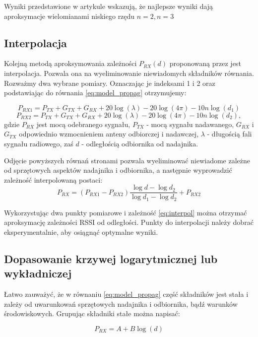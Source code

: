 Wyniki przedstawione w artykule \cite{rssi} wskazują, że najlepsze wyniki dają aproksymacje wielomianami niskiego rzędu $n=2, n=3$

\subsection{Interpolacja}
Kolejną metodą aproksymowania zależności $P_{RX}(d)$ proponowaną przez \cite{rssi} jest interpolacja. Pozwala ona na wyeliminowanie niewiadomych składników równania. Rozważmy dwa wybrane pomiary. Oznaczając je indeksami 1 i 2 oraz podstawiając do równania \ref{eq:model_propag} otrzymujemy:

\begin{equation}
\label{eq:interpol_podst1}
 P_{RX1} = P_{TX}+G_{TX}+G_{RX} + 20\log(\lambda) - 20\log(4\pi) -10n\log(d_1)
\end{equation}
\begin{equation}
\label{eq:interpol_podst2}
 P_{RX2} = P_{TX}+G_{TX}+G_{RX} + 20\log(\lambda) - 20\log(4\pi) -10n\log(d_2),
\end{equation}
gdzie $P_{RX}$ jest mocą odebranego sygnału, $P_{TX}$ - mocą sygnału nadawanego, $G_{RX}$ i $G_{TX}$ odpowiednio wzmocnieniem anteny odbiorczej i nadawczej, $\lambda$ - długością fali sygnału radiowego, zaś $d$ - odległością odbiornika od nadajnika. 

Odjęcie powyższych równań stronami pozwala wyeliminować niewiadome zależne od sprzętowych aspektów nadajnika i odbiornika, a następnie wyprowadzić zależność interpolowaną postaci:
\begin{equation}
\label{eq:interpol}
 P_{RX} = (P_{RX1}-P_{RX2}) \frac{\log{d} - \log{d_2}}{\log{d_1} - \log{d_2}} + P_{RX2}
\end{equation}

Wykorzystując dwa punkty pomiarowe i zależność \ref{eq:interpol} można otrzymać aproksymację zależności RSSI od odległości. Punkty do interpolacji należy dobrać eksperymentalnie, aby osiągnąć optymalne wyniki. 

\subsection{Dopasowanie krzywej logarytmicznej lub wykładniczej}
Łatwo zauważyć, że w równaniu \ref{eq:model_propag} część składników jest stała i zależy od uwarunkowań sprzętowych nadajnika i odbiornika, bądź warunków środowiskowych. Grupując składniki stałe można napisać:

\begin{equation}
\label{eq:logfit}
 P_{RX} = A + B \log(d)
\end{equation}

